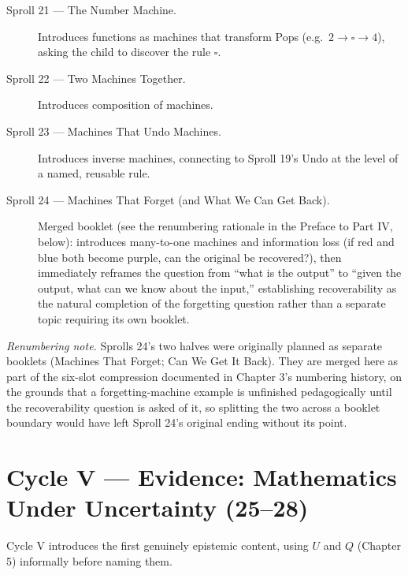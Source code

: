 \documentclass[11pt,twoside]{book}
\begin{document}
\begin{description}
\item[Sproll 21 --- The Number Machine.] Introduces functions as machines that transform Pops (e.g.\ $2 \rightarrow \square \rightarrow 4$), asking the child to discover the rule $\square$.
\item[Sproll 22 --- Two Machines Together.] Introduces composition of machines.
\item[Sproll 23 --- Machines That Undo Machines.] Introduces inverse machines, connecting to Sproll 19's Undo at the level of a named, reusable rule.
\item[Sproll 24 --- Machines That Forget (and What We Can Get Back).] Merged booklet (see the renumbering rationale in the Preface to Part IV, below): introduces many-to-one machines and information loss (if red and blue both become purple, can the original be recovered?), then immediately reframes the question from ``what is the output'' to ``given the output, what can we know about the input,'' establishing recoverability as the natural completion of the forgetting question rather than a separate topic requiring its own booklet.
\end{description}

\emph{Renumbering note.} Sprolls 24's two halves were originally planned as separate booklets (Machines That Forget; Can We Get It Back). They are merged here as part of the six-slot compression documented in Chapter 3's numbering history, on the grounds that a forgetting-machine example is unfinished pedagogically until the recoverability question is asked of it, so splitting the two across a booklet boundary would have left Sproll 24's original ending without its point.

\chapter{Cycle V --- Evidence: Mathematics Under Uncertainty (25--28)}

Cycle V introduces the first genuinely epistemic content, using $U$ and $Q$ (Chapter 5) informally before naming them.
\end{document}
